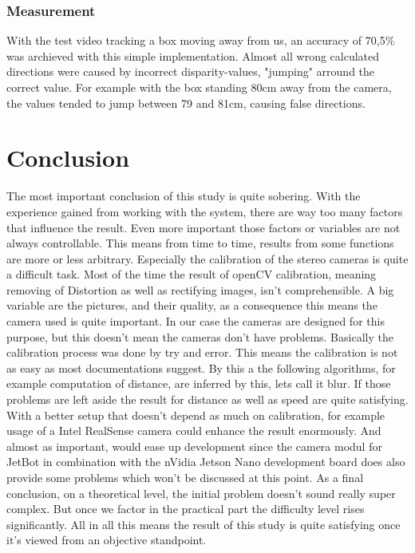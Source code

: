 \documentclass[journal,onecolumn]{IEEEtran}
\begin{document}
\subsubsection{Measurement}
\noindent With the test video tracking a box moving away from us, an accuracy of 70,5\% was archieved with this simple implementation. Almost all wrong calculated directions were caused by incorrect disparity-values, "jumping" arround the correct value. For example with the box standing 80cm away from the camera, the values tended to jump between 79 and 81cm, causing false directions. 

 
\section{Conclusion}
\noindent The most important conclusion of this study is quite sobering. With the experience gained from working with the system, there are way too many factors that influence the result. Even more important those factors or variables are not always controllable. This means from time to time, results from some functions are more or less arbitrary. Especially the calibration of the stereo cameras is quite a difficult task. Most of the time the result of openCV calibration, meaning removing of Distortion as well as rectifying images, isn't comprehensible. A big variable are the pictures, and their quality, as a consequence this means the camera used is quite important. In our case the cameras are designed for this purpose, but this doesn't mean the cameras don't have problems. Basically the calibration process was done by try and error. This means the calibration is not as easy as most documentations suggest. By this a the following algorithms, for example computation of distance, are inferred by this, lets call it blur. \newline
If those problems are left aside the result for distance as well as speed are quite satisfying. With a better setup that doesn't depend as much on calibration, for example usage of a Intel RealSense camera could enhance the result enormously. And almost as important, would ease up development since the camera modul for JetBot in combination with the nVidia Jetson Nano development board does also provide some problems which won't be discussed at this point. \newline
As a final conclusion, on a theoretical level, the initial problem doesn't sound really super complex. But once we factor in the practical part the difficulty level rises significantly. All in all this means the result of this study is quite satisfying once it's viewed from an objective standpoint.
\appendices
\end{document}

